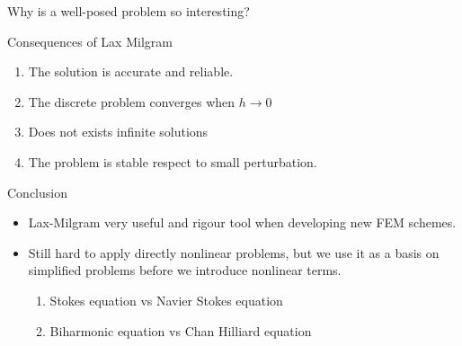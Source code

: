 \begin{frame}{Why is a well-posed problem so interesting?}
    \begin{block}{ Consequences of Lax Milgram }
    \begin{enumerate}
        \item The solution is accurate and reliable.
        \item The discrete problem converges when $h\to 0$
        \item Does not exists infinite solutions
        \item The problem is stable respect to small perturbation.
    \end{enumerate}

    \end{block}
    \begin{block}{Conclusion}
        \begin{itemize}
            \item Lax-Milgram very useful and rigour tool when developing new FEM schemes.
            \item Still hard to apply directly nonlinear problems, but we use it as a basis on simplified problems before we introduce nonlinear terms.
                \begin{enumerate}
                    \item Stokes equation vs Navier Stokes equation
                    \item Biharmonic equation vs Chan Hilliard equation
                \end{enumerate}
        \end{itemize}
    \end{block}

\end{frame}




